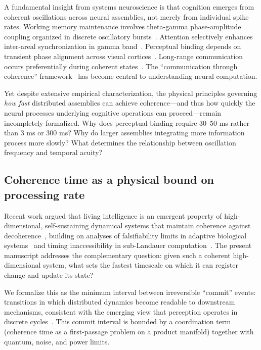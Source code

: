 \documentclass[12pt]{article}
\begin{document}
A fundamental insight from systems neuroscience is that cognition emerges from coherent oscillations across neural assemblies, not merely from individual spike rates. Working memory maintenance involves theta-gamma phase-amplitude coupling organized in discrete oscillatory bursts~\cite{miller2018,lisman2013,lundqvist2016}. Attention selectively enhances inter-areal synchronization in gamma band~\cite{fries2015,womelsdorf2007}. Perceptual binding depends on transient phase alignment across visual cortices~\cite{singer1999,engel2001}. Long-range communication occurs preferentially during coherent states~\cite{varela2001}. The ``communication through coherence'' framework~\cite{fries2005} has become central to understanding neural computation.

Yet despite extensive empirical characterization, the physical principles governing \emph{how fast} distributed assemblies can achieve coherence---and thus how quickly the neural processes underlying cognitive operations can proceed---remain incompletely formalized. Why does perceptual binding require 30--50 ms rather than 3 ms or 300 ms? Why do larger assemblies integrating more information process more slowly? What determines the relationship between oscillation frequency and temporal acuity?

\subsection{Coherence time as a physical bound on processing rate}

Recent work argued that living intelligence is an emergent property of high-dimensional, self-sustaining dynamical systems that maintain coherence against decoherence~\cite{todd2025intelligence}, building on analyses of falsifiability limits in adaptive biological systems~\cite{todd2025biosystems} and timing inaccessibility in sub-Landauer computation~\cite{todd2025demon}. The present manuscript addresses the complementary question: given such a coherent high-dimensional system, what sets the fastest timescale on which it can register change and update its state?

We formalize this as the minimum interval between irreversible ``commit'' events:
transitions in which distributed dynamics become readable to downstream mechanisms,
consistent with the emerging view that perception operates in discrete cycles~\cite{vanrullen2016}.
This commit interval is bounded by a coordination term
(coherence time as a first-passage problem on a product manifold)
together with quantum, noise, and power limits.
\end{document}
